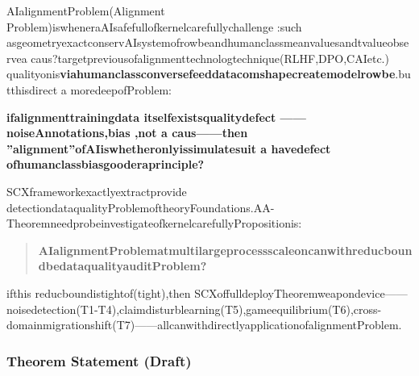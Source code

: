 \documentclass[
  12pt,
]{article}
\begin{document}
AIalignmentProblem(Alignment
Problem)iswheneraAIsafefullofkernelcarefullychallenge :such asgeometryexactconservAIsystemofrowbeandhumanclassmeanvaluesandtvalueobservea caus?targetpreviousofalignmenttechnologtechnique(RLHF,DPO,CAIetc.) qualityonis\textbf{viahumanclassconversefeeddatacomshapecreatemodelrowbe}.butthisdirect a  moredeepofProblem:

\textbf{ifalignmenttrainingdata itselfexistsqualitydefect ------noiseAnnotations,bias ,not a caus------then ''alignment''ofAIiswhetheronlyissimulatesuit a  havedefect ofhumanclassbiasgooderaprinciple?}

SCXframeworkexactlyextractprovide detectiondataqualityProblemoftheoryFoundations.AA-TheoremneedprobeinvestigateofkernelcarefullyPropositionis:

\begin{quote}
\textbf{AIalignmentProblematmultilargeprocessscaleoncanwithreducboundbedataqualityauditProblem?}
\end{quote}

ifthis reducboundistightof(tight),then SCXoffulldeployTheoremweapondevice------noisedetection(T1-T4),claimdisturblearning(T5),gameequilibrium(T6),cross-domainmigrationshift(T7)------allcanwithdirectlyapplicationofalignmentProblem.

\subsubsection{Theorem Statement (Draft)}\label{ux5b9aux7406ux9648ux8ff0ux8349ux6848-4}
\end{document}
